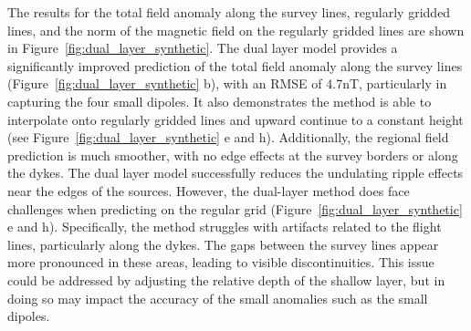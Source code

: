 The results for the total field anomaly along the survey lines, regularly gridded lines, and the norm of the magnetic field on the regularly gridded lines are shown in Figure~\ref{fig:dual_layer_synthetic}. The dual layer model provides a significantly improved prediction of the total field anomaly along the survey lines (Figure~\ref{fig:dual_layer_synthetic} b), with an RMSE of 4.7nT, particularly in capturing the four small dipoles. It also demonstrates the method is able to interpolate onto regularly gridded lines and upward continue to a constant height (see Figure~\ref{fig:dual_layer_synthetic} e and h). Additionally, the regional field prediction is much smoother, with no edge effects at the survey borders or along the dykes. The dual layer model successfully reduces the undulating ripple effects near the edges of the sources. However, the dual-layer method does face challenges when predicting on the regular grid (Figure~\ref{fig:dual_layer_synthetic} e and h). Specifically, the method struggles with artifacts related to the flight lines, particularly along the dykes. The gaps between the survey lines appear more pronounced in these areas, leading to visible discontinuities. This issue could be addressed by adjusting the relative depth of the shallow layer, but in doing so may impact the accuracy of the small anomalies such as the small dipoles.
